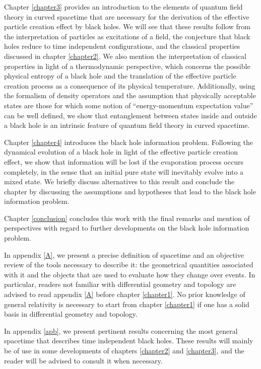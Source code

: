 \documentclass[
12pt,		%
openright,	%
twoside,  %
a4paper,			%
chapter=TITLE,		%
english,			%
french,				%
spanish,			%
brazil				%
]{USPSC-classe/USPSC}
\begin{document}
Chapter \ref{chapter3} provides an introduction to the elements of quantum field theory in curved spacetime that are necessary for the derivation of the effective particle creation effect by black holes. We will see that these results follow from the interpretation of particles as excitations of a field, the conjecture that black holes reduce to time independent configurations, and the classical properties discussed in chapter \ref{chapter2}. We also mention the interpretation of classical properties in light of a thermodynamic perspective, which concerns the possible physical entropy of a black hole and the translation of the effective particle creation process as a consequence of its physical temperature. Additionally, using the formalism of density operators and the assumption that physically acceptable states are those for which some notion of ``energy-momentum expectation value'' can be well defined, we show that entanglement between states inside and outside a black hole is an intrinsic feature of quantum field theory in curved spacetime.

Chapter \ref{chapter4} introduces the black hole information problem. Following the dynamical evolution of a black hole in light of the effective particle creation effect, we show that information will be lost if the evaporation process occurs completely, in the sense that an initial pure state will inevitably evolve into a mixed state. We briefly discuss alternatives to this result and conclude the chapter by discussing the assumptions and hypotheses that lead to the black hole information problem.

Chapter \ref{conclusion} concludes this work with the final remarks and mention of perspectives with regard to further developments on the black hole information problem.

In appendix \ref{A}, we present a precise definition of spacetime and an objective review of the tools necessary to describe it: the geometrical quantities associated with it and the objects that are used to evaluate how they change over events. In particular, readers not familiar with differential geometry and topology are advised to read appendix \ref{A} before chapter \ref{chapter1}. No prior knowledge of general relativity is necessary to start from chapter \ref{chapter1} if one has a solid basis in differential geometry and topology.

In appendix \ref{apb}, we present pertinent results concerning the most general spacetime that describes time independent black holes. These results will mainly be of use in some developments of chapters \ref{chapter2} and \ref{chapter3}, and the reader will be advised to consult it when necessary.
\end{document}

